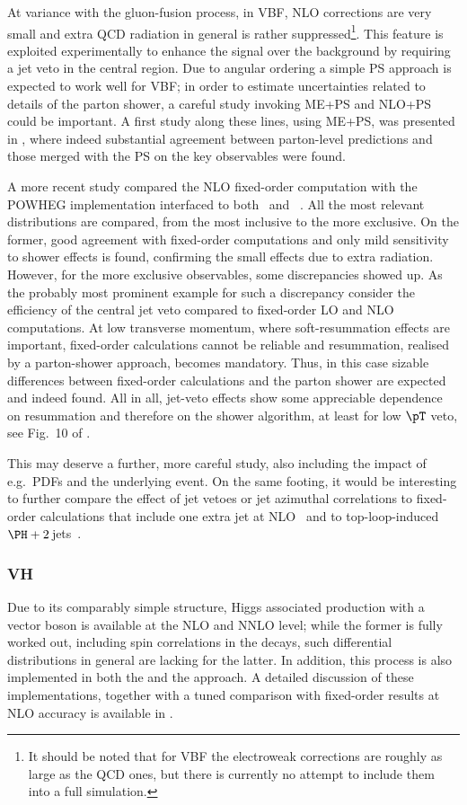 At variance with the gluon-fusion process, in VBF, NLO corrections are 
very small and extra QCD radiation in general is rather suppressed\footnote{
     It should be noted that for VBF the electroweak corrections are roughly 
     as large as the QCD ones, but there is currently no attempt to include
     them into a full simulation.
}. This feature is exploited experimentally to enhance the signal over the 
background by requiring a jet veto in the central region.  Due to angular 
ordering a simple PS approach is expected to work well for VBF; in 
order to estimate uncertainties related to details of the parton shower, a 
careful study invoking ME+PS and NLO+PS could be important.  A first study 
along these lines, using ME+PS, was presented in , 
where indeed substantial agreement between parton-level predictions and those 
merged with the PS on the key observables were found.

A more recent study compared the NLO fixed-order computation with the POWHEG 
implementation interfaced to both \pythia\ and \herwig~\cite{Nason:2009ai}.  
All the most relevant distributions are compared, from the most inclusive to 
the more exclusive. On the former, good agreement with fixed-order 
computations and only mild sensitivity to shower effects is found, confirming 
the small effects due to extra radiation.  However, for the more exclusive
observables, some discrepancies showed up.  As the probably most prominent 
example for such a discrepancy consider the efficiency of the central jet 
veto compared to fixed-order LO and NLO computations.  At low transverse 
momentum, where soft-resummation effects are important, fixed-order 
calculations cannot be reliable and resummation, realised by a parton-shower 
approach, becomes mandatory.  Thus, in this case sizable differences between 
fixed-order calculations and the parton shower are expected and indeed found.  
All in all, jet-veto effects show some appreciable dependence on resummation 
and therefore on the shower algorithm, at least for low $\pT$ veto, see 
Fig.~10 of .  

This may deserve a further, more careful study, also including the impact of 
e.g.\ PDFs and the underlying event.  On the same footing, it would be 
interesting to further compare the effect of jet vetoes or jet azimuthal 
correlations to fixed-order calculations that include one extra jet at 
NLO~\cite{Figy:2007kv} and to top-loop-induced 
$\PH + 2\,$jets~\cite{Campbell:2010cz}.

\subsubsection{VH}
Due to its comparably simple structure, Higgs associated production
with a vector boson is available at the NLO and NNLO level; while the former 
is fully worked out, including spin correlations in the decays, such 
differential distributions in general are lacking for the latter.  In 
addition, this process is also implemented in both the \MCatNLO and the 
\POWHEG approach.  A detailed discussion of these implementations, together 
with a tuned comparison with fixed-order results at NLO accuracy is available 
in .  

